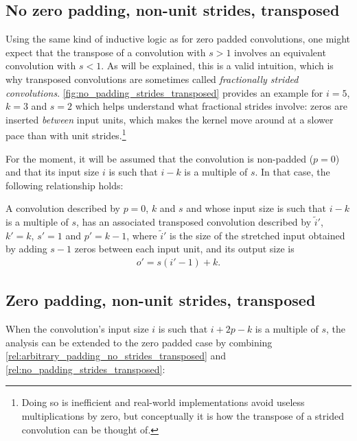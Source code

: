 \subsection{No zero padding, non-unit strides, transposed}

Using the same kind of inductive logic as for zero padded convolutions, one
might expect that the transpose of a convolution with $s > 1$ involves an
equivalent convolution with $s < 1$. As will be explained, this is a valid
intuition, which is why transposed convolutions are sometimes called {\em
fractionally strided convolutions}.
\autoref{fig:no_padding_strides_transposed} provides an example for $i = 5$, $k
= 3$ and $s = 2$ which helps understand what fractional strides involve: zeros
are inserted {\em between\/} input units, which makes the kernel move around at
a slower pace than with unit strides.\footnote{Doing so is inefficient and
    real-world implementations avoid useless multiplications by zero, but
    conceptually it is how the transpose of a strided convolution can be
    thought of.}

For the moment, it will be assumed that the convolution is non-padded ($p = 0$)
and that its input size $i$ is such that $i - k$ is a multiple of $s$. In that
case, the following relationship holds:

\begin{relationship}\label{rel:no_padding_strides_transposed}
A convolution described by $p = 0$, $k$ and $s$ and whose input
size is such that $i - k$ is a multiple of $s$, has an associated transposed
convolution described by $\tilde{i}'$, $k' = k$, $s' = 1$ and $p' = k - 1$,
where $\tilde{i}'$ is the size of the stretched input obtained by adding
$s - 1$ zeros between each input unit, and its output size is
\begin{equation*}
\begin{split}
    o' = s (i' - 1) + k.
\end{split}
\end{equation*}
\end{relationship}

\subsection{Zero padding, non-unit strides, transposed}

When the convolution's input size $i$ is such that $i + 2p - k$ is a multiple
of $s$, the analysis can be extended to the zero padded case by combining
\autoref{rel:arbitrary_padding_no_strides_transposed} and
\autoref{rel:no_padding_strides_transposed}:

